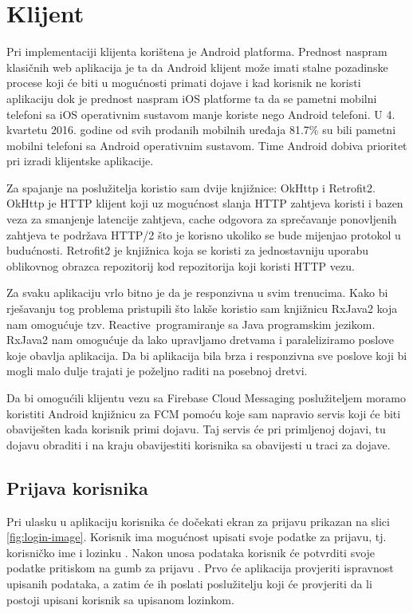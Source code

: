 \documentclass[times, utf8, zavrsni]{fer}
\begin{document}
\section{Klijent}
Pri implementaciji klijenta korištena je Android platforma. Prednost naspram klasičnih web aplikacija je ta da Android klijent može imati stalne pozadinske procese koji će biti u mogućnosti primati dojave i kad korisnik ne koristi aplikaciju dok je prednost naspram iOS platforme ta da se pametni mobilni telefoni sa iOS operativnim sustavom manje koriste nego Android telefoni. U 4. kvartetu 2016. godine od svih prodanih mobilnih uređaja 81.7\% \citep{vincent2017} su bili pametni mobilni telefoni sa Android operativnim sustavom. Time Android dobiva prioritet pri izradi klijentske aplikacije.

Za spajanje na poslužitelja koristio sam dvije knjižnice: OkHttp i Retrofit2. OkHttp je HTTP klijent koji uz mogućnost slanja HTTP zahtjeva koristi i bazen veza za smanjenje latencije zahtjeva, cache odgovora za sprečavanje ponovljenih zahtjeva te podržava HTTP/2 što je korisno ukoliko se bude mijenjao protokol u budućnosti. Retrofit2 je knjižnica koja se koristi za jednostavniju uporabu oblikovnog obrazca repozitorij kod repozitorija koji koristi HTTP vezu.

Za svaku aplikaciju vrlo bitno je da je responzivna u svim trenucima. Kako bi rješavanju tog problema pristupili što lakše koristio sam knjižnicu RxJava2 koja nam omogućuje tzv. \glqq Reactive\grqq\  programiranje sa Java programskim jezikom. RxJava2 nam omogućuje da lako upravljamo dretvama i paraleliziramo poslove koje obavlja aplikacija. Da bi aplikacija bila brza i responzivna sve poslove koji bi mogli malo dulje trajati je poželjno raditi na posebnoj dretvi.

Da bi omogućili klijentu vezu sa Firebase Cloud Messaging poslužiteljem moramo koristiti Android knjižnicu za FCM pomoću koje sam napravio servis koji će biti obaviješten kada korisnik primi dojavu. Taj servis će pri primljenoj dojavi, tu dojavu obraditi i na kraju obavijestiti korisnika sa obavijesti u traci za dojave.

\subsection{Prijava korisnika}
Pri ulasku u aplikaciju korisnika će dočekati ekran za prijavu prikazan na slici \ref{fig:login-image}. Korisnik ima mogućnost upisati svoje podatke za prijavu, tj. korisničko ime  i lozinku . Nakon unosa podataka korisnik će potvrditi svoje podatke pritiskom na gumb za prijavu . Prvo će aplikacija provjeriti ispravnost upisanih podataka, a zatim će ih poslati poslužitelju koji će provjeriti da li postoji upisani korisnik sa upisanom lozinkom.
\end{document}
